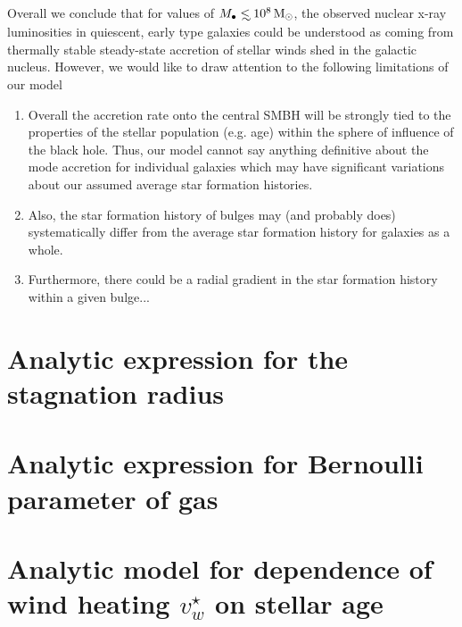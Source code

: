 \documentclass[usenatbib,fleqn]{mn2e}
\newcommand\lsim{\mathrel{\rlap{\lower4pt\hbox{\hskip1pt$\sim$}}
    \raise1pt\hbox{$<$}}}
\newcommand{\Mbh}[1][]{M_{\bullet#1}}
\newcommand{\vwO}{v_{w}}
\begin{document}
    Overall we conclude that for values of $\Mbh\lsim 10^{8} \Msun$,
    the observed nuclear x-ray luminosities in quiescent, early type
    galaxies could be understood as coming from thermally stable
    steady-state accretion of stellar winds shed in the galactic
    nucleus.  However, we would like to draw attention to the
    following limitations of our model

    \begin{enumerate}
    \item Overall the accretion rate onto the central SMBH will be strongly
    tied to the properties of the stellar population (e.g. age) within
    the sphere of influence of the black hole. Thus, our model cannot
    say anything definitive about the mode accretion for individual
    galaxies which may have significant variations about our assumed
    average star formation histories.
    \item Also, the star formation history of bulges may (and probably
      does) systematically differ from the average star formation
      history for galaxies as a whole.
    \item Furthermore, there could be a radial gradient in the star
      formation history within a given bulge... 
    \end{enumerate}
  

  


  \clearpage
  \appendix
  \section{Analytic expression for the stagnation radius}
  \label{app:rs}
  

  \section{Analytic expression for Bernoulli parameter of gas}
  \label{app:be}
  

  \section{Analytic model for dependence of wind heating $\vwO^{\star}$ on stellar age}
\label{app:windheat}


  \footnotesize{
    
    
  }
\end{document}
